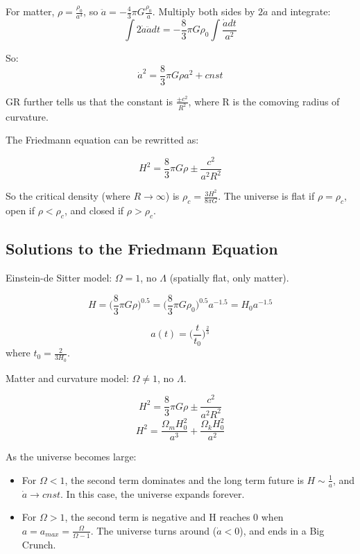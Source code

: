 For matter, $\rho = \frac{\rho_0}{a^3}$, so $\ddot a = -\frac{4}{3}\pi G\frac{\rho_0}{a}$.  Multiply both sides by $2\dot a$ and integrate:
\begin{equation}
\int 2\dot a \ddot adt = -\frac{8}{3}\pi G\rho_0 \int \frac{\dot a dt}{a^2}
\end{equation}

So:  
\begin{equation}
\dot  a^2 =\frac{8}{3}\pi G\rho a^2 + cnst
\end{equation}

GR further tells us that the constant is $\frac{\pm c^2}{R^2}$, where R is the comoving radius of curvature.  

The Friedmann equation can be rewritted as:

\begin{equation}
H^2 = \frac{8}{3}\pi G\rho \pm \frac{c^2}{a^2R^2}
\end{equation}

So the critical density (where $R \rightarrow \infty$) is $\rho_c = \frac{3H^2}{8\pi G}$.  The universe is flat if $\rho = \rho_c$, open if $\rho < \rho_c$, and closed if $\rho > \rho_c$.

\subsection{Solutions to the Friedmann Equation}

Einstein-de Sitter model:  $\Omega = 1$, no $\Lambda$ (spatially flat, only matter).

\begin{equation}
H = \bigg(\frac{8}{3}\pi G\rho \bigg)^{0.5} = \bigg(\frac{8}{3}\pi G\rho_0 \bigg)^{0.5}a^{-1.5} = H_0a^{-1.5}
\end{equation}

\begin{equation}
a(t) = \bigg(\frac{t}{t_0}\bigg)^{\frac{2}{3}}
\end{equation}
where $t_0 = \frac{2}{3H_0}$.  

Matter and curvature model:  $\Omega \ne 1$, no $\Lambda$.

\begin{equation}
H^2 = \frac{8}{3}\pi G\rho \pm \frac{c^2}{a^2R^2}
\end{equation}
\begin{equation}
H^2 = \frac{\Omega_mH_0^2}{a^3} + \frac{\Omega_kH_0^2}{a^2}
\end{equation}

As the universe becomes large:
\begin{itemize}
\item For $\Omega < 1$, the second term dominates and the long term future is $H \sim \frac{1}{a}$, and $\dot a \rightarrow cnst$.  In this case, the universe expands forever.
\item For $\Omega > 1$, the second term is negative and H reaches 0 when $a = a_{max} = \frac{\Omega}{\Omega - 1}$.  The universe turns around ($\dot a < 0$), and ends in a Big Crunch.
\end{itemize}

